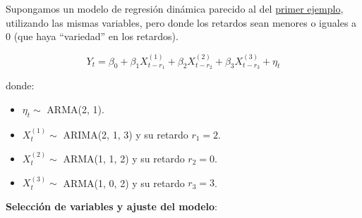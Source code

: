 \documentclass[
  12pt,
  a4paper]{article}
\newenvironment{Shaded}{\begin{snugshade}}{\end{snugshade}}
\newcommand{\CommentTok}[1]{\textcolor[rgb]{0.56,0.35,0.01}{\textit{#1}}}
\newcommand{\DecValTok}[1]{\textcolor[rgb]{0.00,0.00,0.81}{#1}}
\newcommand{\FloatTok}[1]{\textcolor[rgb]{0.00,0.00,0.81}{#1}}
\newcommand{\FunctionTok}[1]{\textcolor[rgb]{0.00,0.00,0.00}{#1}}
\newcommand{\NormalTok}[1]{#1}
\newcommand{\OtherTok}[1]{\textcolor[rgb]{0.56,0.35,0.01}{#1}}
\newcommand{\SpecialCharTok}[1]{\textcolor[rgb]{0.00,0.00,0.00}{#1}}
\providecommand{\tightlist}{%
  \setlength{\itemsep}{0pt}\setlength{\parskip}{0pt}}
\begin{document}
Supongamos un modelo de regresión dinámica parecido al del
\protect\hyperlink{ejemplo1}{primer ejemplo}, utilizando las mismas
variables, pero donde los retardos sean menores o iguales a 0 (que haya
``variedad'' en los retardos).

\begin{equation}\label{eq:ejemplo2}
    Y_t = \beta_0 + \beta_1 X_{t-r_1}^{(1)} + \beta_2 X_{t-r_2}^{(2)} + \beta_3 X_{t-r_3}^{(3)} + \eta_t
\end{equation}

donde:

\begin{itemize}
\tightlist
\item
  \(\eta_t \sim\) ARMA(2, 1).
\item
  \(X_t^{(1)} \sim\) ARIMA(2, 1, 3) y su retardo \(r_1=2\).
\item
  \(X_t^{(2)} \sim\) ARMA(1, 1, 2) y su retardo \(r_2=0\).
\item
  \(X_t^{(3)} \sim\) ARMA(1, 0, 2) y su retardo \(r_3=3\).
\end{itemize}

\begin{Shaded}
\end{Shaded}

\textbf{Selección de variables y ajuste del modelo}:
\end{document}
